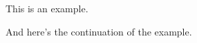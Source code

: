 \documentclass{article}
\begin{document}
\begin{example}[label=exa:cont]
This is an example.
\end{example}

\begin{example}[continues=exa:cont]
And here's the continuation of the example.
\end{example}
\end{document}
